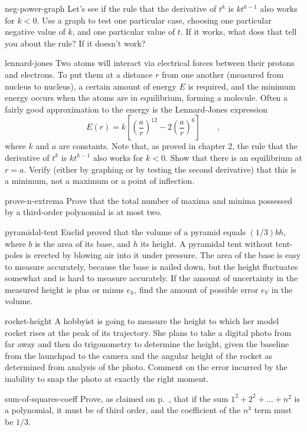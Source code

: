 \begin{hwsection}
\begin{hwwithsoln}{neg-power-graph}
Let's see if the rule that the derivative of $t^k$ is $kt^{k-1}$ also works for $k<0$.
Use a graph to test one particular case, choosing one particular negative value of $k$, and one 
particular value of $t$. If it works, what does that tell you about the rule? If it
doesn't work?
\end{hwwithsoln}

\begin{hwwithsoln}{lennard-jones}
Two atoms will interact via electrical forces between
their protons and electrons. To put them at a distance $r$ from one another (measured from
nucleus to nucleus), a certain amount of energy $E$ is required, and the minimum energy
occurs when the atoms are in equilibrium, forming a molecule. Often a fairly good approximation
to the energy is the Lennard-Jones expression
\begin{equation*}
  E(r) = k\left[\left(\frac{a}{r}\right)^{12}-2\left(\frac{a}{r}\right)^6\right] \qquad ,
\end{equation*}
where $k$ and $a$ are constants. Note that, as proved in chapter 2, the rule that
the derivative of $t^k$ is $kt^{k-1}$ also works for $k<0$.
Show that there is an equilibrium at $r=a$. Verify (either by graphing or by testing
the second derivative) that this is a minimum, not a maximum or a point of inflection.
\end{hwwithsoln}

\begin{hwwithsoln}{prove-n-extrema}
Prove that the total number of maxima and minima possessed by a third-order polynomial
is at most two.
\end{hwwithsoln}

\begin{hwwithsoln}{pyramidal-tent}
Euclid proved that the volume of a pyramid equals $(1/3)bh$, where $b$ is the area of its
base, and $h$ its height. A pyramidal tent without tent-poles is erected by blowing air
into it under pressure. The area of the base is easy to measure accurately, because the
base is nailed down, but the height fluctuates somewhat and is hard to measure accurately.
If the amount of uncertainty in the measured height is plus or minus $e_h$, find the
amount of possible error $e_V$ in the volume.
\end{hwwithsoln}

\begin{hwwithsoln}{rocket-height}
A hobbyist is going to measure the height to which her model rocket rises at the peak of
its trajectory. She plans to
take a digital photo from far away and then do trigonometry to determine the height,
given the baseline from the launchpad to the camera and the angular height of the rocket
as determined from analysis of the photo. Comment on the error incurred by the inability to
snap the photo at exactly the right moment.
\end{hwwithsoln}

\begin{hwwithsoln}{sum-of-squares-coeff}
Prove, as claimed on p.~\pageref{claim-sum-of-squares-coeff}, that
if the sum $1^2+2^2+\ldots+n^2$ is a polynomial, it must be of third
order, and the coefficient of the $n^3$ term must be $1/3$.
\end{hwwithsoln}


\end{hwsection}
